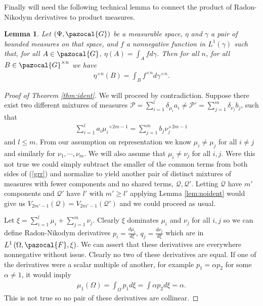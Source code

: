 \documentclass{article} %
\def\sF{\pazocal{F}}
\def\sG{\pazocal{G}}
\def\sP{\mathscr{P}}
\def\sQ{\mathscr{Q}}
\newtheorem{lem}{Lemma}
\theoremstyle{definition}
\begin{document}
Finally will need the following technical lemma to connect the product of Radon-Nikodym derivatives to product measures.
\begin{lem} \label{lem:radprod}
	Let $\left( \Psi, \sG \right)$ be a measurable space, $\eta$ and $\gamma$ a pair of bounded measures on that space, and $f$ a nonnegative function in $L^1\left( \gamma \right)$ such that, for all $A \in \sG$, $\eta\left( A \right)=\int_A f d\gamma$. Then for all $n$, for all $B \in \sG^{\times n}$ we have
\begin{eqnarray*}
	\eta^{\times n}\left( B \right) = \int_B f^{\times n} d\gamma^{\times n}.
\end{eqnarray*}
\end{lem}
\begin{proof}[Proof of Theorem \ref{thm:ident}]
	We will proceed by contradiction. Suppose there exist two different mixtures of measures $\sP = \sum_{i=1}^l \delta_{\mu_i} a_i \neq \sP' = \sum_{j=1}^m \delta_{\nu_j}b_j$, such that
	\begin{eqnarray} \label{grr}
		\sum_{i=1}^{l} a_i {\mu_i}^{\times 2m-1} = \sum_{j=1}^{m} b_j {\nu}_j^{\times 2m-1}
	\end{eqnarray}
and $l\le m$. From our assumption on representation we know $\mu_i \neq \mu_j$ for all $i\neq j$ and similarly for $\nu_1,\cdots, \nu_m$. We will also assume that $\mu_i \neq \nu_j$ for all $i,j$. Were this not true we could simply subtract the smaller of the common terms from both sides of (\ref{grr}) and normalize to yield another pair of distinct mixtures of measures with fewer components and no shared terms, $\sQ, \sQ'$. Letting $\sQ$ have $m'$ components and $\sQ'$ have $l'$ with $m'\ge l'$ applying Lemma \ref{lem:noident} would give us $V_{2m'-1}\left( \sQ \right)= V_{2m'-1}\left( \sQ' \right)$ and we could proceed as usual.

	Let $\xi = \sum_{i=1}^l \mu_i + \sum_{j=1}^m \nu_j$. Clearly $\xi$ dominates $\mu_i$ and $\nu_j$ for all $i,j$ so we can define Radon-Nikodym derivatives $p_i = \frac{d \mu_i}{d \xi}$, $q_j = \frac{d \nu_j}{d \xi}$ which are in $L^1\left( \Omega , \sF, \xi \right)$. We can assert that these derivatives are everywhere nonnegative without issue. Clearly no two of these derivatives are equal. If one of the derivatives were a scalar multiple of another, for example $p_1 = \alpha p_2$ for some $\alpha \neq 1$, it would imply
\begin{eqnarray*}
	\mu_1\left( \Omega \right) = \int_{\Omega} p_1 d\xi = \int \alpha p_2 d\xi=\alpha.
\end{eqnarray*}
This is not true so no pair of these derivatives are collinear.


\end{proof}
\end{document}
